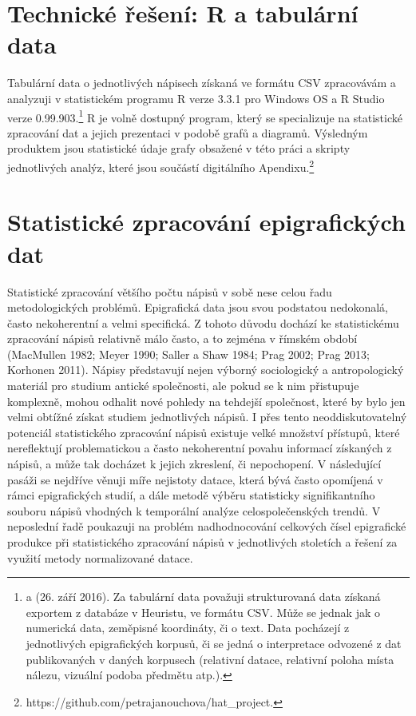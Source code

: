 \section[technické-řešení-r-a-tabulární-data]{Technické řešení: R a tabulární data}

Tabulární data o jednotlivých nápisech získaná ve formátu CSV zpracovávám a analyzuji v statistickém programu R verze 3.3.1 pro Windows OS a R Studio verze 0.99.903.\footnote{\from[url15] a \from[url16] (26. září 2016). Za tabulární data považuji strukturovaná data získaná exportem z databáze v Heuristu, ve formátu CSV. Může se jednak jak o numerická data, zeměpisné koordináty, či o text. Data pocházejí z jednotlivých epigrafických korpusů, či se jedná o interpretace odvozené z dat publikovaných v daných korpusech (relativní datace, relativní poloha místa nálezu, vizuální podoba předmětu atp.).} R je volně dostupný program, který se specializuje na statistické zpracování dat a jejich prezentaci v podobě grafů a diagramů. Výsledným produktem jsou statistické údaje grafy obsažené v této práci a skripty jednotlivých analýz, které jsou součástí digitálního Apendixu.\footnote{https://github.com/petrajanouchova/hat_project.}

\section[statistické-zpracování-epigrafických-dat]{Statistické zpracování epigrafických dat}

Statistické zpracování většího počtu nápisů v sobě nese celou řadu metodologických problémů. Epigrafická data jsou svou podstatou nedokonalá, často nekoherentní a velmi specifická. Z tohoto důvodu dochází ke statistickému zpracování nápisů relativně málo často, a to zejména v římském období (MacMullen 1982; Meyer 1990; Saller a Shaw 1984; Prag 2002; Prag 2013; Korhonen 2011). Nápisy představují nejen výborný sociologický a antropologický materiál pro studium antické společnosti, ale pokud se k nim přistupuje komplexně, mohou odhalit nové pohledy na tehdejší společnost, které by bylo jen velmi obtížné získat studiem jednotlivých nápisů. I přes tento neoddiskutovatelný potenciál statistického zpracování nápisů existuje velké množství přístupů, které nereflektují problematickou a často nekoherentní povahu informací získaných z nápisů, a může tak docházet k jejich zkreslení, či nepochopení. V následující pasáži se nejdříve věnuji míře nejistoty datace, která bývá často opomíjená v rámci epigrafických studií, a dále metodě výběru statisticky signifikantního souboru nápisů vhodných k temporální analýze celospolečenských trendů. V neposlední řadě poukazuji na problém nadhodnocování celkových čísel epigrafické produkce při statistického zpracování nápisů v jednotlivých stoletích a řešení za využití metody normalizované datace.

